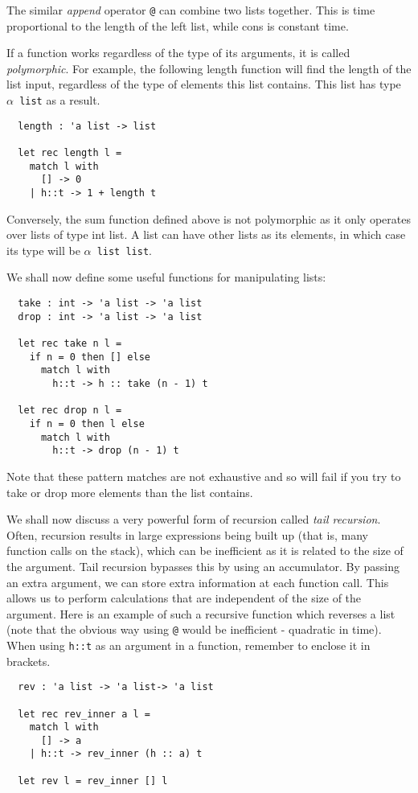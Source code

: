 \documentclass[12pt]{article}
\begin{document}
The similar \textit{append} operator \texttt{@} can combine two lists together. This is time proportional to the length of the left list,
while cons is constant time.

If a function works regardless of the type of its arguments, it is called \textit{polymorphic}. For example, the following length
function will find the length of the list input, regardless of the type of elements this list contains. This list has type \texttt{$\alpha$ list} as
a result.
\begin{lstlisting}
  length : 'a list -> list

  let rec length l =
    match l with
      [] -> 0
    | h::t -> 1 + length t
\end{lstlisting}
Conversely, the sum function defined above is not polymorphic as it only operates over lists of type int list. A list can have
other lists as its elements, in which case its type will be \texttt{$\alpha$ list list}.

We shall now define some useful functions for manipulating lists:
\begin{lstlisting}
  take : int -> 'a list -> 'a list
  drop : int -> 'a list -> 'a list

  let rec take n l =
    if n = 0 then [] else
      match l with
        h::t -> h :: take (n - 1) t

  let rec drop n l =
    if n = 0 then l else
      match l with
        h::t -> drop (n - 1) t
\end{lstlisting}
Note that these pattern matches are not exhaustive and so will fail if you try to take or drop more elements than the list
contains.

We shall now discuss a very powerful form of recursion called \textit{tail recursion}. Often, recursion results in
large expressions being built up (that is, many function calls on the stack), which can be inefficient as it is related to the
size of the argument. Tail recursion
bypasses this by using an accumulator. By passing an extra argument, we can store extra information at each function
call. This allows us to perform calculations that are independent of the size of the argument. Here is an example of
such a recursive function which reverses a list (note that the obvious way using \texttt{@} would be inefficient - quadratic in time).
When using \texttt{h::t} as an argument in a function, remember to enclose it in brackets.
\begin{lstlisting}
  rev : 'a list -> 'a list-> 'a list

  let rec rev_inner a l =
    match l with
      [] -> a
    | h::t -> rev_inner (h :: a) t

  let rev l = rev_inner [] l
\end{lstlisting}
\end{document}
